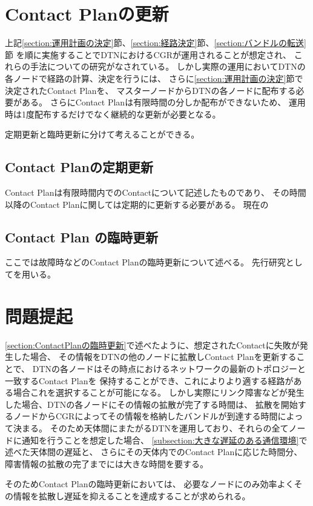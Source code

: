 \section{Contact Planの更新}
\label{section:ContactPlanの更新}

上記\ref{section:運用計画の決定}節、\ref{section:経路決定}節、\ref{section:バンドルの転送}節
を順に実施することでDTNにおけるCGRが運用されることが想定され、
これらの手法についての研究がなされている。
しかし実際の運用においてDTNの各ノードで経路の計算、決定を行うには、
さらに\ref{section:運用計画の決定}節で決定されたContact Planを、
マスターノードからDTNの各ノードに配布する必要がある。
さらにContact Planは有限時間の分しか配布ができないため、
運用時は1度配布するだけでなく継続的な更新が必要となる。

定期更新と臨時更新に分けて考えることができる。

\subsection{Contact Planの定期更新}
\label{sec:ContactPlanの定期更新}
Contact Planは有限時間内でのContactについて記述したものであり、
その時間以降のContact Planに関しては定期的に更新する必要がある。
現在の

\subsection{Contact Plan の臨時更新}
\label{sec:ContactPlanの臨時更新}
ここでは故障時などのContact Planの臨時更新について述べる。
先行研究として\cite{Bezirgiannidis2013}を用いる。

\section{問題提起}
\label{sec:ContactPlanの臨時更新の課題}
\ref{section:ContactPlanの臨時更新}で述べたように、想定されたContactに失敗が発生した場合、
その情報をDTNの他のノードに拡散しContact Planを更新することで、
DTNの各ノードはその時点におけるネットワークの最新のトポロジーと一致するContact Planを
保持することができ、これによりより適する経路がある場合これを選択することが可能になる。
しかし実際にリンク障害などが発生した場合、DTNの各ノードにその情報の拡散が完了する時間は、
拡散を開始するノードからCGRによってその情報を格納したバンドルが到達する時間によって決まる。
そのため天体間にまたがるDTNを運用しており、それらの全てノードに通知を行うことを想定した場合、
\ref{subsection:大きな遅延のある通信環境}で述べた天体間の遅延と、
さらにその天体内でのContact Planに応じた時間分、障害情報の拡散の完了までには大きな時間を要する。

そのためContact Planの臨時更新においては、
必要なノードにのみ効率よくその情報を拡散し遅延を抑えることを達成することが求められる。